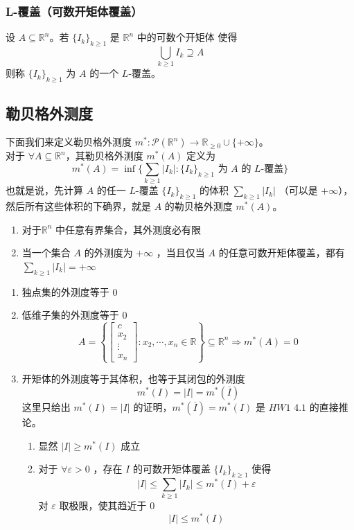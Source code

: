 \documentclass{ctexbook}
\newcommand{\no}{\noindent}
\newcommand{\pro}{\no{\bf 证明：}}
\newcommand{\EXP}{\no {\bf 例}\quad}
\newcommand{\R}{\mathbb{R}}
\newcommand{\ITEMS}{\begin{enumerate}[leftmargin=4em]}
\newcommand{\ITEME}{\end{enumerate}}
\begin{document}
\subsubsection{L-覆盖（可数开矩体覆盖）}

设 $A\subseteq \R^n$。若 $\{I_k\}_{k\ge1}$ 是 $\R^n$ 中的可数个开矩体 使得
\[
\bigcup_{k\ge 1} I_k \supseteq A
\]
则称 $\{I_k\}_{k\ge1}$ 为 $A$ 的一个 $L$-覆盖。

\subsection{勒贝格外测度}

下面我们来定义勒贝格外测度 $m^*: \mathcal {P}(\R^n) \to \R_{\ge0} \cup \{+\infty\}$。\\

对于 $\forall A\subseteq \R^n$，其勒贝格外测度 $m^*(A)$ 定义为
\[
m^*(A) = \inf\{\sum_{k\ge 1} \lvert I_k \rvert: \mbox {$\{I_k\}_{k\ge1}$ 为 $A$ 的
	 $L$-覆盖}\}
\]
也就是说，先计算 $A$ 的任一 $L$-覆盖 $\{I_k\}_{k\ge1}$ 的体积 $\sum_{k\ge 1} \lvert I_k \rvert$ （可以是 $+\infty$），然后所有这些体积的下确界，就是 $A$ 的勒贝格外测度 $m^*(A)$。

\ITEMS
\item 对于$\R^n$ 中任意有界集合，其外测度必有限
\item 当一个集合 $A$ 的外测度为 $+\infty$ ，当且仅当 $A$ 的任意可数开矩体覆盖，都有 $\sum\limits_{k\ge1}\lvert I_k \rvert = +\infty$
\ITEME

\EXP
\ITEMS
\item 独点集的外测度等于 $0$
\item 低维子集的外测度等于 $0$
\[
A = \left\lbrace\begin{bmatrix} c\\ x_2 \\ \vdots\\ x_n\end{bmatrix}: x_2,\cdots,x_n\in\R\right\rbrace \subseteq \R^n \Rightarrow m^*(A) = 0
\]
\item 开矩体的外测度等于其体积，也等于其闭包的外测度
\[
m^*(I) = \lvert I\rvert = m^*(\overline I)
\]
\pro 这里只给出 $m^*(I) = \lvert I\rvert$ 的证明，$m^*(\overline I)= m^*(I)$ 是 $HW1$ $4.1$ 的直接推论。
\ITEMS
	\item 显然 $\lvert I\rvert \ge m^*(I)$ 成立
	\item 对于 $\forall \varepsilon > 0$ ，存在 $I$ 的可数开矩体覆盖 $\{I_k\}_{k\ge 1}$ 使得
\[
\lvert I \rvert \le \sum_{k\ge1} \lvert I_k \rvert \le m^*(I) +\varepsilon
\]
对 $\varepsilon$ 取极限，使其趋近于 $0$
\[
\lvert I \rvert \le m^*(I) 
\]
\ITEME
\ITEME
\end{document}
